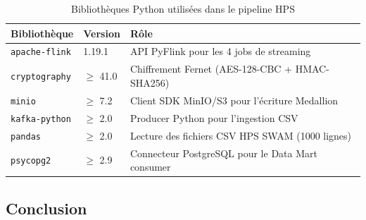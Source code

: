 \begin{table}[H]
\centering
\renewcommand{\arraystretch}{1.5}
\begin{tabular}{|l|l|p{9cm}|}
\hline
\textbf{Bibliothèque} & \textbf{Version} & \textbf{Rôle} \\
\hline
\texttt{apache-flink}   & 1.19.1        & API PyFlink pour les 4 jobs de streaming \\
\texttt{cryptography}   & $\geq$ 41.0   & Chiffrement Fernet (AES-128-CBC + HMAC-SHA256) \\
\texttt{minio}          & $\geq$ 7.2    & Client SDK MinIO/S3 pour l'écriture Medallion \\
\texttt{kafka-python}   & $\geq$ 2.0    & Producer Python pour l'ingestion CSV \\
\texttt{pandas}         & $\geq$ 2.0    & Lecture des fichiers CSV HPS SWAM (1000 lignes) \\
\texttt{psycopg2}       & $\geq$ 2.9    & Connecteur PostgreSQL pour le Data Mart consumer \\
\hline
\end{tabular}
\caption{Bibliothèques Python utilisées dans le pipeline HPS}
\label{tab:libs}
\end{table}

\newpage

\subsection*{Conclusion}
{}
\vspace{0.5cm}

